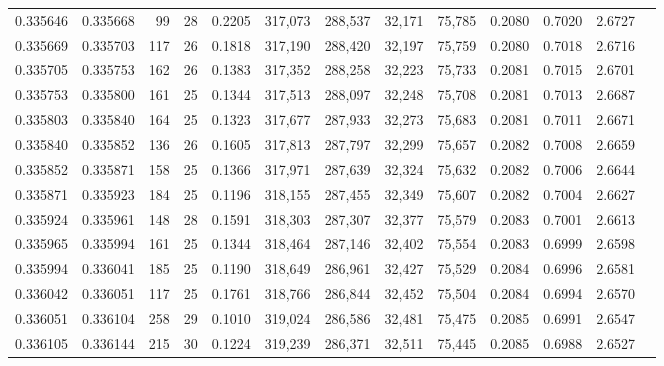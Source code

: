 \begin{tabular}{rrrrrrrrrrrrr}
0.335646 & 0.335668 &    99 &  28 &                                     0.2205 & 317,073 & 288,537 &  32,171 &  75,785 & 0.2080 & 0.7020 & 2.6727 \\
0.335669 & 0.335703 &   117 &  26 &                                     0.1818 & 317,190 & 288,420 &  32,197 &  75,759 & 0.2080 & 0.7018 & 2.6716 \\
0.335705 & 0.335753 &   162 &  26 &                                     0.1383 & 317,352 & 288,258 &  32,223 &  75,733 & 0.2081 & 0.7015 & 2.6701 \\
0.335753 & 0.335800 &   161 &  25 &                                     0.1344 & 317,513 & 288,097 &  32,248 &  75,708 & 0.2081 & 0.7013 & 2.6687 \\
0.335803 & 0.335840 &   164 &  25 &                                     0.1323 & 317,677 & 287,933 &  32,273 &  75,683 & 0.2081 & 0.7011 & 2.6671 \\
0.335840 & 0.335852 &   136 &  26 &                                     0.1605 & 317,813 & 287,797 &  32,299 &  75,657 & 0.2082 & 0.7008 & 2.6659 \\
0.335852 & 0.335871 &   158 &  25 &                                     0.1366 & 317,971 & 287,639 &  32,324 &  75,632 & 0.2082 & 0.7006 & 2.6644 \\
0.335871 & 0.335923 &   184 &  25 &                                     0.1196 & 318,155 & 287,455 &  32,349 &  75,607 & 0.2082 & 0.7004 & 2.6627 \\
0.335924 & 0.335961 &   148 &  28 &                                     0.1591 & 318,303 & 287,307 &  32,377 &  75,579 & 0.2083 & 0.7001 & 2.6613 \\
0.335965 & 0.335994 &   161 &  25 &                                     0.1344 & 318,464 & 287,146 &  32,402 &  75,554 & 0.2083 & 0.6999 & 2.6598 \\
0.335994 & 0.336041 &   185 &  25 &                                     0.1190 & 318,649 & 286,961 &  32,427 &  75,529 & 0.2084 & 0.6996 & 2.6581 \\
0.336042 & 0.336051 &   117 &  25 &                                     0.1761 & 318,766 & 286,844 &  32,452 &  75,504 & 0.2084 & 0.6994 & 2.6570 \\
0.336051 & 0.336104 &   258 &  29 &                                     0.1010 & 319,024 & 286,586 &  32,481 &  75,475 & 0.2085 & 0.6991 & 2.6547 \\
0.336105 & 0.336144 &   215 &  30 &                                     0.1224 & 319,239 & 286,371 &  32,511 &  75,445 & 0.2085 & 0.6988 & 2.6527 \\

\end{tabular}

